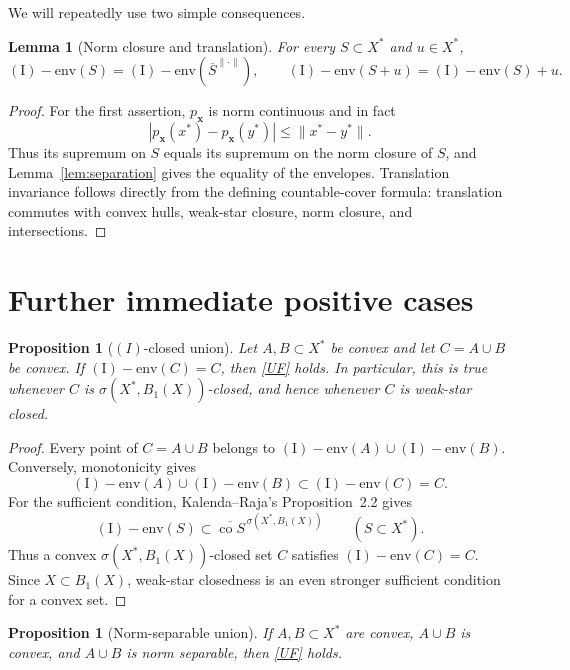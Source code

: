 \documentclass[11pt]{article}
\newtheorem{proposition}[theorem]{Proposition}
\newtheorem{lemma}[theorem]{Lemma}
\theoremstyle{remark}
\newcommand{\Ienv}{\operatorname{(I)\!\!-env}}
\newcommand{\co}{\operatorname{co}}
\begin{document}
We will repeatedly use two simple consequences.

\begin{lemma}[Norm closure and translation]
\label{lem:invariance}
For every $S\subset X^*$ and $u\in X^*$,
\[
 \Ienv(S)=\Ienv(\overline S^{\|\cdot\|}),
 \qquad
 \Ienv(S+u)=\Ienv(S)+u.
\]
\end{lemma}

\begin{proof}
For the first assertion, $p_{\mathbf{x}}$ is norm continuous and in fact
\[
 |p_{\mathbf{x}}(x^*)-p_{\mathbf{x}}(y^*)|
 \leq \|x^*-y^*\|.
\]
Thus its supremum on $S$ equals its supremum on the norm closure of $S$,
and Lemma~\ref{lem:separation} gives the equality of the envelopes.
Translation invariance follows directly from the defining countable-cover
formula: translation commutes with convex hulls, weak-star closure, norm
closure, and intersections.
\end{proof}

\section{Further immediate positive cases}

\begin{proposition}[$(I)$-closed union]
\label{prop:Iclosed}
Let $A,B\subset X^*$ be convex and let $C=A\cup B$ be convex.  If
$\Ienv(C)=C$, then \eqref{UF} holds.  In particular, this is true whenever
$C$ is $\sigma(X^*,B_1(X))$-closed, and hence whenever $C$ is weak-star
closed.
\end{proposition}

\begin{proof}
Every point of $C=A\cup B$ belongs to $\Ienv(A)\cup\Ienv(B)$.  Conversely,
monotonicity gives
\[
 \Ienv(A)\cup\Ienv(B)\subset\Ienv(C)=C.
\]
For the sufficient condition, Kalenda--Raja's Proposition~2.2 gives
\[
 \Ienv(S)\subset
 \overline{\co S}^{\,\sigma(X^*,B_1(X))}
 \qquad(S\subset X^*).
\]
Thus a convex $\sigma(X^*,B_1(X))$-closed set $C$ satisfies
$\Ienv(C)=C$.  Since $X\subset B_1(X)$, weak-star closedness is an even
stronger sufficient condition for a convex set.
\end{proof}

\begin{proposition}[Norm-separable union]
\label{prop:separable}
If $A,B\subset X^*$ are convex, $A\cup B$ is convex, and $A\cup B$ is norm
separable, then \eqref{UF} holds.
\end{proposition}
\end{document}
